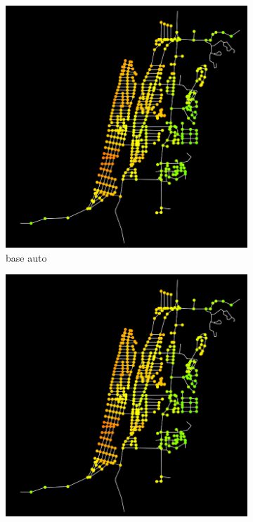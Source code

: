 \begin{figure}
    \centering
    \begin{subfigure}{0.475\textwidth}
        \centering
        \includegraphics[width=\textwidth]{images/analisi/comparison-ev-times-map-base-car.png}
        \caption{base auto}
    \end{subfigure}
    \hfill
    \begin{subfigure}{0.475\textwidth}
        \centering
        \includegraphics[width=\textwidth]{images/analisi/comparison-ev-times-map-new-car.png}

\end{subfigure}
\end{figure}
